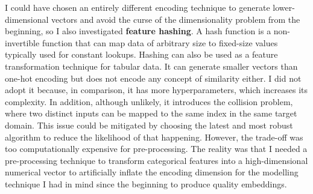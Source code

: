 I could have chosen an entirely different encoding technique to generate lower-dimensional vectors
and avoid the curse of the dimensionality problem from the beginning, so I also investigated \textbf{feature hashing}.
A hash function is a non-invertible function that can map data of arbitrary size to fixed-size values typically used for constant lookups.
Hashing can also be used as a feature transformation technique for tabular data.
It can generate smaller vectors than one-hot encoding but does not encode any concept of similarity either.
I did not adopt it because, in comparison, it has more hyperparameters, which increases its complexity.
In addition, although unlikely, it introduces the collision problem,
where two distinct inputs can be mapped to the same index in the same target domain.
This issue could be mitigated by choosing the latest and most robust algorithm to reduce the likelihood of that happening.
However, the trade-off was too computationally expensive for pre-processing.
The reality was that I needed a pre-processing technique to transform categorical features into a high-dimensional numerical vector
to artificially inflate the encoding dimension for the modelling technique I had in mind since the beginning to produce quality embeddings.
